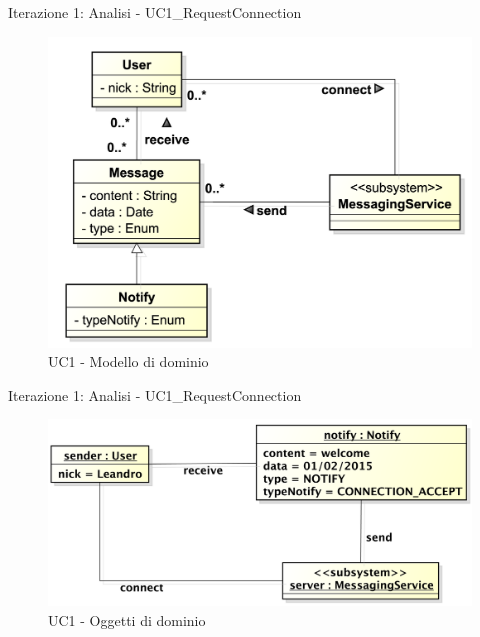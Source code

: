 \begin{frame} {Iterazione 1: Analisi - UC1\_RequestConnection}
   \begin{figure}
     \includegraphics[scale=0.34]{image_astah/Iteration_1_DomainModel/UC1_RequestConnection_DM.png}{\centering}
     \caption{UC1 - Modello di dominio}
     \label{fig_UC1_RC_DM} 
   \end{figure}
\end{frame}

\begin{frame} {Iterazione 1: Analisi - UC1\_RequestConnection}
   \begin{figure}
     \includegraphics[scale=0.35]{image_astah/Iteration_1_DomainModel/UC1_RequestConnection_OM}{\centering}
     \caption{UC1 - Oggetti di dominio}
     \label{fig_UC1_RC_OM} 
   \end{figure}
\end{frame}

